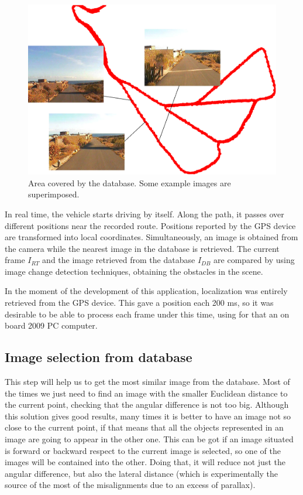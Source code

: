 \begin{figure}[thb]
  \centering
  \includegraphics{database}
  \caption{Area covered by the database. Some example images are superimposed.}
  \label{fig:cp01_image_database}
\end{figure}

In real time, the vehicle starts driving by itself. Along the path, it passes over different positions near the recorded route. Positions reported by the \acs{GPS} device are transformed into local coordinates. Simultaneously, an image is obtained from the camera while the nearest image in the database is retrieved. The current frame $I_{RT}$ and the image retrieved from the database $I_{DB}$ are compared by using image change detection techniques, obtaining the obstacles in the scene.

In the moment of the development of this application, localization was entirely retrieved from the \acs{GPS} device. This gave a position each 200 ms, so it was desirable to be able to process each frame under this time, using for that an on board 2009 PC computer.

\subsection{Image selection from database}\label{ch:chapter01_01_01}

This step will help us to get the most similar image from the database. Most of the times we just need to find an image with the smaller Euclidean distance to the current point, checking that the angular difference is not too big. Although this solution gives good results, many times it is better to have an image not so close to the current point, if that means that all the objects represented in an image are going to appear in the other one. This can be got if an image situated is forward or backward respect to the current image is selected, so one of the images will be contained into the other. Doing that, it will reduce not just the angular difference, but also the lateral distance (which is experimentally the source of the most of the misalignments due to an excess of parallax).

